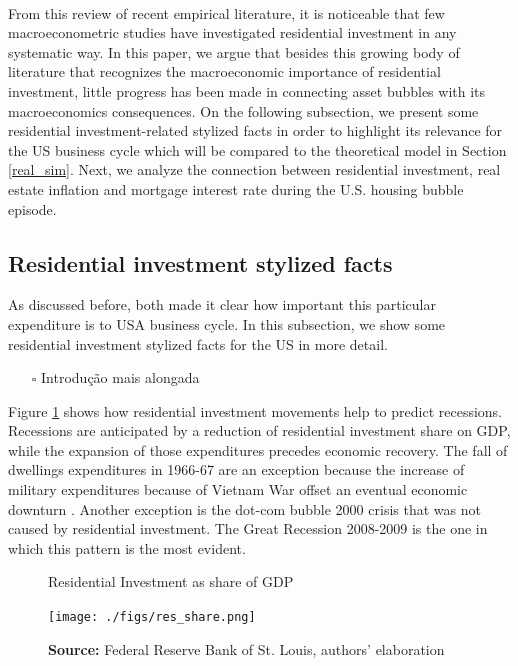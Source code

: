 \documentclass[11pt]{article}
\begin{document}
\\
From this review of recent empirical literature, it is noticeable that few macroeconometric studies have investigated residential investment in any systematic way.
In this paper, we argue that besides this growing body of literature that recognizes the macroeconomic importance of residential investment, little progress has been made in connecting asset bubbles with its macroeconomics consequences.
On the following subsection, we present some residential investment-related stylized facts in order to highlight its relevance for the US business cycle which will be compared to the theoretical model in Section \ref{real_sim}.
Next, we analyze the connection between residential investment, real estate inflation and mortgage interest rate during the U.S. housing bubble episode.

\subsection{Residential investment stylized facts}
\label{sec:orgb42e4ee}

As discussed before, both \textcites{green_follow_1997}{leamer_housing_2007} made it clear how important this particular expenditure is to USA business cycle. In this subsection, we show some residential investment stylized facts for the US in more detail.

\begin{itemize}
\item[{$\square$}] Introdução mais alongada
\end{itemize}

Figure \ref{Investo_Resid_GDP} shows how residential investment movements help to predict recessions. Recessions are anticipated by a reduction of residential investment share on GDP, while the expansion of those expenditures precedes economic recovery. The fall of dwellings expenditures in 1966-67 are an exception because the increase of military expenditures because of Vietnam War offset an eventual economic downturn \cite[p.~20]{leamer_housing_2007}. Another exception is the dot-com bubble 2000 crisis that was not caused by residential investment. The Great Recession 2008-2009 is the one in which this pattern is the most evident. 



\begin{figure}[htb]
    \centering
        \caption{Residential Investment as share of GDP}
        \label{Investo_Resid_GDP}
    \texttt{[image: ./figs/res\_share.png]}
    \caption*{\textbf{Source:} Federal Reserve Bank of St. Louis, authors’ elaboration}
\end{figure}
\end{document}
